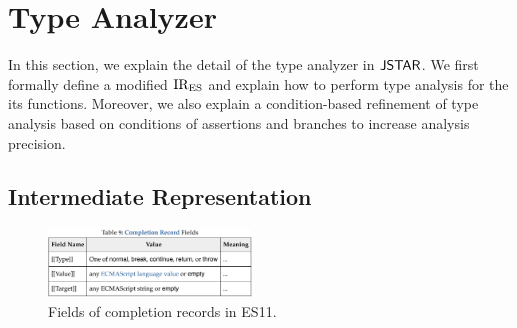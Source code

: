 \section{Type Analyzer}\label{sec:analyzer}

In this section, we explain the detail of the type analyzer in $\tool$. We first
formally define a modified ${\text{IR}_\text{ES}}$ and explain how to perform type analysis for
the its functions.  Moreover, we also explain a condition-based refinement of
type analysis based on conditions of assertions and branches to increase
analysis precision.

\subsection{Intermediate Representation}\label{sec:ires}

\begin{figure}
  \centering
  \includegraphics[width=0.48\textwidth]{img/record-fields-table}
  \caption{Fields of completion records in ES11.}
  \label{fig:record-fields-table}
  \vspace*{-1.5em}
\end{figure}


